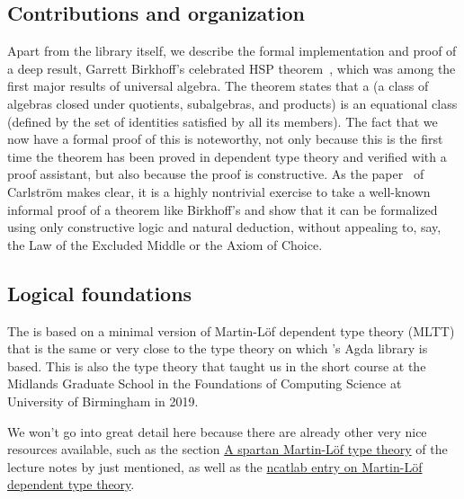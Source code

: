 \subsection*{Contributions and organization}
\label{sec:contributions}

Apart from the library itself, we describe the formal implementation and proof of a deep result, Garrett Birkhoff's celebrated HSP theorem~\cite{Birkhoff:1935}, which was among the first major results of universal algebra.  The theorem states that a  (a class of algebras closed under quotients, subalgebras, and products) is an equational class (defined by the set of identities satisfied by all its members).  %
The fact that we now have a formal proof of this is noteworthy, not only because this is the first time the theorem has been proved in dependent type theory and verified with a proof assistant, but also because the proof is constructive. As the paper~\cite{Carlstrom:2008} of Carlstr\"om makes clear, it is a highly nontrivial exercise to take a well-known informal proof of a theorem like Birkhoff's and show that it can be formalized using only constructive logic and natural deduction, without appealing to, say, the Law of the Excluded Middle or the Axiom of Choice.


\subsection*{Logical foundations}
The \agdaualib is based on a minimal version of Martin-Löf dependent type theory (MLTT) that is the same or very close to the type theory on which \MartinEscardo's \TypeTopology Agda library is based. This is also the type theory
that \escardo taught us in the short course \ufcourse at the Midlands Graduate School in the Foundations of Computing Science at University of Birmingham in 2019.

We won't go into great detail here because there are already other very nice resources available, such as the section \href{https://www.cs.bham.ac.uk/~mhe/HoTT-UF-in-Agda-Lecture-Notes/HoTT-UF-Agda.html\#mlttinagda}{A spartan Martin-Löf type theory} of the lecture notes by \escardo just mentioned, as well as the \href{https://ncatlab.org/nlab/show/Martin-L\%C3\%B6f+dependent+type+theory}{ncatlab entry on Martin-Löf dependent type theory}.

